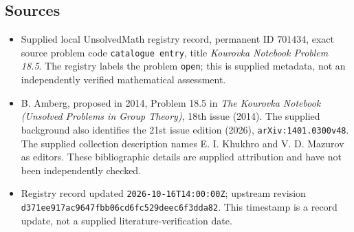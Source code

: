 \documentclass[11pt]{article}
\begin{document}
\subsection{Sources}
\begin{itemize}
\item Supplied local UnsolvedMath registry record, permanent ID \(701434\), exact source problem code \texttt{catalogue entry}, title \emph{Kourovka Notebook Problem 18.5}. The registry labels the problem \texttt{open}; this is supplied metadata, not an independently verified mathematical assessment.
\item B. Amberg, proposed in 2014, Problem 18.5 in \emph{The Kourovka Notebook (Unsolved Problems in Group Theory)}, 18th issue (2014). The supplied background also identifies the 21st issue edition (2026), \texttt{arXiv:1401.0300v48}. The supplied collection description names E. I. Khukhro and V. D. Mazurov as editors. These bibliographic details are supplied attribution and have not been independently checked.
\item Registry record updated \texttt{2026-10-16T14:00:00Z}; upstream revision \texttt{d371ee917ac9647fbb06cd6fc529deec6f3dda82}. This timestamp is a record update, not a supplied literature-verification date.
\end{itemize}
\end{document}
